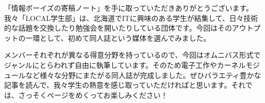 「情報ボーイズの寄稿ノート」を手に取っていただきありがとうございます。我々「LOCAL学生部」は、北海道でITに興味のある学生が結集して、日々技術的な話題を交換したり勉強会を開いたりしている団体です。今回はそのアウトプットの一環として、初めて同人誌という媒体を選んでみました。

メンバーそれぞれが異なる得意分野を持っているので、今回はオムニバス形式でジャンルにとらわれず自由に執筆しています。そのため電子工作やカーネルモジュールなど様々な分野にまたがる同人誌が完成しました。ぜひバラエティ豊かな記事を読んで、我々学生の熱意を感じ取っていただければと思います。それでは、さっそくページをめくってお楽しみください！